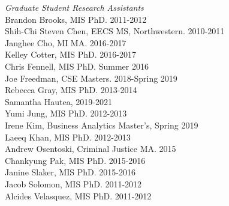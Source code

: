 \documentclass[9pt]{extarticle}
\begin{document}
\emph{Graduate Student Research Assistants} \\[1pt]
Brandon Brooks, MIS PhD. 2011-2012 \\
Shih-Chi Steven Chen, EECS MS, Northwestern. 2010-2011 \\
Janghee Cho, MI MA. 2016-2017 \\
Kelley Cotter, MIS PhD. 2016-2017 \\
Chris Fennell, MIS PhD. Summer 2016 \\
Joe Freedman, CSE Masters. 2018-Spring 2019 \\
Rebecca Gray, MIS PhD. 2013-2014 \\
Samantha Hautea, 2019-2021 \\
Yumi Jung, MIS PhD. 2012-2013 \\
Irene Kim, Business Analytics Master's, Spring 2019 \\
Laeeq Khan, MIS PhD. 2012-2013 \\
Andrew Osentoski, Criminal Justice MA. 2015 \\
Chankyung Pak, MIS PhD. 2015-2016 \\
Janine Slaker, MIS PhD. 2015-2016 \\
Jacob Solomon, MIS PhD. 2011-2012 \\
Alcides Velasquez, MIS PhD. 2011-2012
\end{document}
